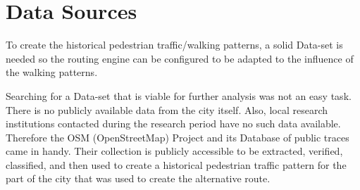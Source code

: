 \section{Data Sources}

To create the historical pedestrian traffic/walking patterns, a solid Data-set is needed so the routing engine can be configured to be adapted to the influence of the walking patterns. 

Searching for a Data-set that is viable for further analysis was not an easy task. There is no publicly available data from the city itself. Also, local research institutions contacted during the research period have no such data available. Therefore the OSM (OpenStreetMap) Project and its Database of public traces came in handy. Their collection is publicly accessible to be extracted, verified, classified, and then used to create a historical pedestrian traffic pattern for the part of the city that was used to create the alternative route.

%
%
%

